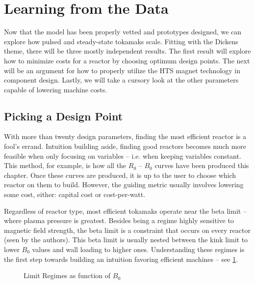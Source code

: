 \begin{table}[h!]
\begin{subtable}[t]{0.5\textwidth}
\begin{tabular}{ c|c }
\end{tabular}
\end{subtable}
\hfill
\hfill
\end{table}

\section{Learning from the Data}

Now that the model has been properly vetted and prototypes designed, we can explore how pulsed and steady-state tokamaks scale. Fitting with the Dickens theme, there will be three mostly independent results. The first result will explore how to minimize costs for a reactor by choosing optimum design points. The next will be an argument for how to properly utilize the HTS magnet technology in component design. Lastly, we will take a cursory look at the other parameters capable of lowering machine costs.

\subsection{Picking a Design Point}

With more than twenty design parameters, finding the most efficient reactor is a fool's errand. Intuition building aside, finding good reactors becomes much more feasible when only focusing on  variables -- i.e. when keeping  variables constant. This method, for example, is how all the $R_0$ -- $B_0$ curves have been produced this chapter. Once these curves are produced, it is up to the user to choose which reactor on them to build. However, the guiding metric usually involves lowering some cost, either: capital cost or cost-per-watt.

Regardless of reactor type, most efficient tokamaks operate near the beta limit -- where plasma pressure is greatest. Besides being a regime highly sensitive to magnetic field strength, the beta limit is a constraint that occurs on every reactor (seen by the authors). This beta limit is usually nested between the kink limit to lower $B_0$ values and wall loading to higher ones. Understanding these regimes is the first step towards building an intuition favoring efficient machines -- see \cref{fig:limit_regimes}.

\begin{figure}
\centering
\begin{adjustbox}{width=0.75\textwidth}
	
\end{adjustbox}
\caption{Limit Regimes as function of $B_0$}
\label{fig:limit_regimes}
\end{figure}

